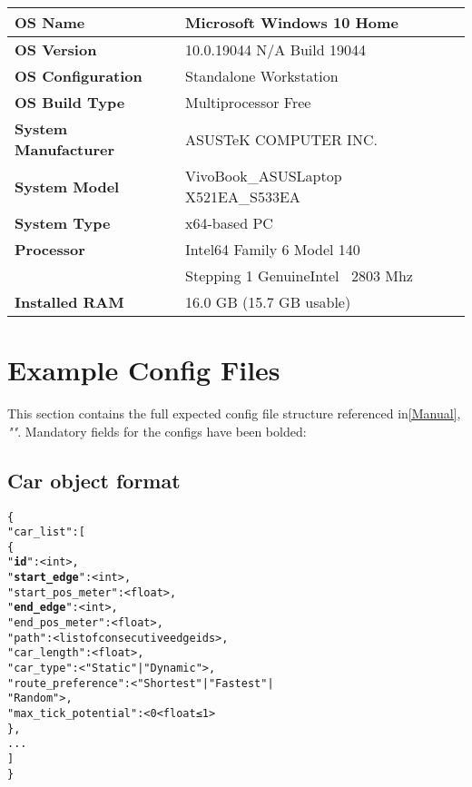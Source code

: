 \begin{center}
    \noindent \begin{tabular}{l l}  %
    \toprule
    \textbf{OS Name} & Microsoft Windows 10 Home\\
    \midrule
    \textbf{OS Version} & 10.0.19044 N/A Build 19044\\
    \midrule
    \textbf{OS Configuration} & Standalone Workstation\\
    \midrule
    \textbf{OS Build Type} & Multiprocessor Free\\
    \midrule
    \textbf{System Manufacturer} & ASUSTeK COMPUTER INC.\\
    \midrule
    \textbf{System Model} & VivoBook\_ASUSLaptop X521EA\_S533EA\\
    \midrule
    \textbf{System Type} &  x64-based PC\\
    \midrule
    \textbf{Processor} & Intel64 Family 6 Model 140 \\
    & Stepping 1 GenuineIntel ~2803 Mhz \\
    \midrule
    \textbf{Installed RAM} & 16.0 GB (15.7 GB usable)\\
    \bottomrule
    \end{tabular}
\end{center}

 
\section{Example Config Files}
\label{Configs}
This section contains the full expected config file structure referenced in\autoref{Manual}, \textit{""}.  Mandatory fields for the configs have been bolded:

\subsection{Car object format}

\begin{alltt}
\{
    "car_list": [
        \{
            "\textbf{id}": <int>,
            "\textbf{start_edge}": <int>, 
            "start_pos_meter": <float>, 
            "\textbf{end_edge}": <int>,
            "end_pos_meter": <float>,
            "path": <list of consecutive edge ids>,
            "car_length": <float>, 
            "car_type": <"Static" | "Dynamic">,
            "route_preference": <"Shortest" | "Fastest" | 
                                 "Random">,
            "max_tick_potential": <0 < float ≤ 1>
        \},
        ...
    ]
\}
\end{alltt}


